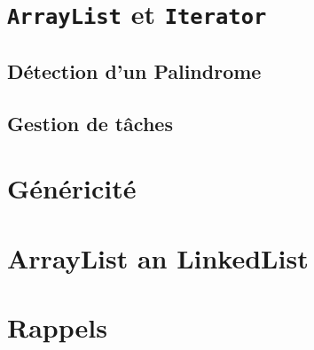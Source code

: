 \documentclass[12pt,a4paper,openany]{book}
\begin{document}
	\thispagestyle{empty} %
	\titleBC 
	\setcounter{tocdepth}{2}
	\setcounter{secnumdepth}{3}
	\tableofcontents
	\chapter{\texttt{ArrayList} et \texttt{Iterator}}
	\section{Détection d'un Palindrome}
		
	\section{Gestion de tâches}
		
		
	\chapter{Généricité}
		
	\chapter{ArrayList an LinkedList}
		
	\appendix
	\chapter{Rappels}
	\lstlistoflistings
\end{document}
